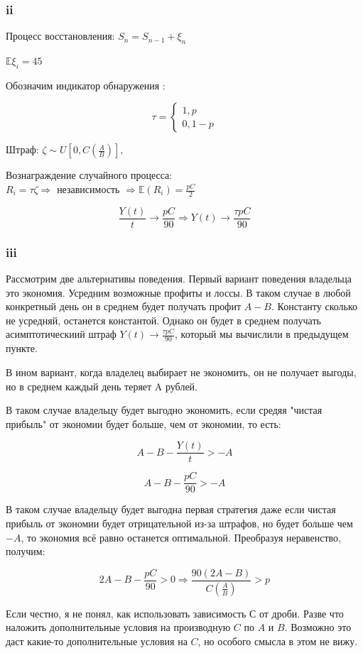 \documentclass[a4paper,12pt]{article}
\def \mbb{\mathbb}
\def \E{\mbb{E}}
\def \t{\tau}
\begin{document}
\subsubsection{ii}

Процесс восстановления: $ S_n = S_{n-1} + \xi_n $

$ \E \xi_i = 45 $

Обозначим индикатор обнаружения :

\[\tau = \begin{cases}
1,  p\\
0, 1-p
\end{cases}  \]

Штраф: $ \zeta \sim U[0, C(\frac{A}{B})],  $

Вознаграждение случайного процесса:  $ R_i = \tau \zeta  \Rightarrow \text{ независимость } \Rightarrow \E(R_i) = \frac{p C}{2}$

\[ \frac{Y(t)}{t} \to \frac{p C}{90} \Rightarrow Y(t) \to \frac{\tau p C}{90}\]


\subsubsection{iii}

Рассмотрим две альтернативы поведения. Первый вариант поведения владельца это экономия. Усредним возможные профиты и лоссы. В таком случае в любой конкретный день он в среднем будет получать профит $ A - B $. Константу сколько не усредняй, останется константой. Однако он будет в среднем получать асимптотическиий штраф  $ Y(t) \to \frac{\t p C}{90} $, который мы вычислили в предыдущем пункте.

В ином вариант, когда владелец выбирает не экономить, он не получает выгоды, но в среднем каждый день теряет A рублей.

В таком случае владельцу будет выгодно экономить, если средяя "чистая прибыль" от экономии будет больше, чем от экономии, то есть:

\[ A - B - \frac{Y(t)}{t} > -A \]

\[ A - B - \frac{p C}{90} > -A \]

В таком случае владельцу будет выгодна первая стратегия даже если чистая прибыль от экономии будет отрицательной из-за штрафов, но будет больше чем $ -A $, то экономия всё равно останется оптимальной. Преобразуя неравенство, получим:

\[  2A - B - \frac{pC}{90} > 0 \Rightarrow \frac{90(2A-B)}{C(\frac{A}{B})} > p\]

Если честно, я не понял, как использовать зависимость $ С $ от дроби. Разве что наложить дополнительные условия на производную $ C $ по $ A $ и $ B $. Возможно это даст какие-то дополнительные условия на $ C $, но особого смысла в этом не вижу.
\end{document}
